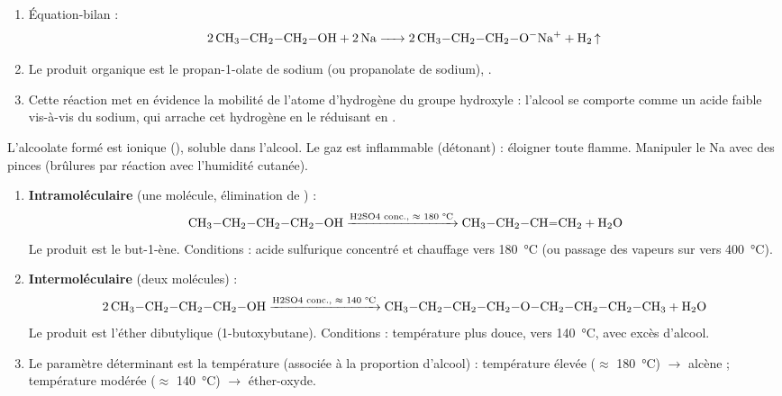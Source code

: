 \documentclass[11pt]{article}
\newcommand{\cle}[1]{{\popxbold\color{popdark}#1}}
\begin{document}
\begin{corrige}
\begin{enumerate}
  \item Équation-bilan :
  \[ \ce{2 CH3-CH2-CH2-OH + 2 Na -> 2 CH3-CH2-CH2-O^-Na+ + H2 ^} \]
  \item Le produit organique est le \cle{propan-1-olate de sodium} (ou propanolate de sodium), .
  \item Cette réaction met en évidence la \cle{mobilité de l'atome d'hydrogène} du groupe hydroxyle  : l'alcool se comporte comme un acide faible vis-à-vis du sodium, qui arrache cet hydrogène en le réduisant en .
\end{enumerate}
\end{corrige}

\begin{attention}
L'alcoolate formé est ionique (), soluble dans l'alcool. Le gaz  est inflammable (détonant) : éloigner toute flamme. Manipuler le Na avec des pinces (brûlures par réaction avec l'humidité cutanée).
\end{attention}

\begin{corrige}
\begin{enumerate}
  \item \textbf{Intramoléculaire} (une molécule, élimination de ) :
  \[ \ce{CH3-CH2-CH2-CH2-OH ->[\text{H2SO4 conc., $\approx$ 180 °C}] CH3-CH2-CH=CH2 + H2O} \]
  Le produit est le \cle{but-1-ène}. Conditions : acide sulfurique concentré et chauffage vers \SI{180}{\celsius} (ou passage des vapeurs sur  vers \SI{400}{\celsius}).
  \item \textbf{Intermoléculaire} (deux molécules) :
  \[ \ce{2 CH3-CH2-CH2-CH2-OH ->[\text{H2SO4 conc., $\approx$ 140 °C}] CH3-CH2-CH2-CH2-O-CH2-CH2-CH2-CH3 + H2O} \]
  Le produit est l'\cle{éther dibutylique} (1-butoxybutane). Conditions : température plus douce, vers \SI{140}{\celsius}, avec excès d'alcool.
  \item Le paramètre déterminant est la \cle{température} (associée à la proportion d'alcool) : température élevée ($\approx$ \SI{180}{\celsius}) $\rightarrow$ alcène ; température modérée ($\approx$ \SI{140}{\celsius}) $\rightarrow$ éther-oxyde.
\end{enumerate}
\end{corrige}
\end{document}
